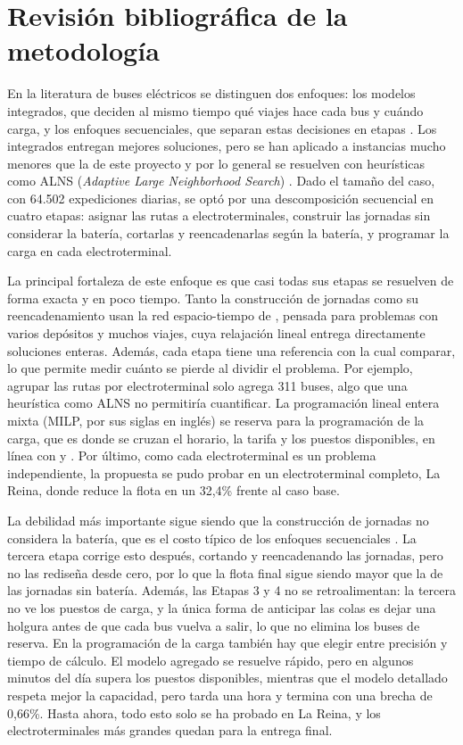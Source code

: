 \section{Revisión bibliográfica de la metodología}

En la literatura de buses eléctricos se distinguen dos enfoques: los modelos integrados, que deciden al mismo tiempo qué viajes hace cada bus y cuándo carga, y los enfoques secuenciales, que separan estas decisiones en etapas \cite{perumal2022}. Los integrados entregan mejores soluciones, pero se han aplicado a instancias mucho menores que la de este proyecto y por lo general se resuelven con heurísticas como ALNS (\textit{Adaptive Large Neighborhood Search}) \cite{wen2016, wang2024}. Dado el tamaño del caso, con 64.502 expediciones diarias, se optó por una descomposición secuencial en cuatro etapas: asignar las rutas a electroterminales, construir las jornadas sin considerar la batería, cortarlas y reencadenarlas según la batería, y programar la carga en cada electroterminal.

La principal fortaleza de este enfoque es que casi todas sus etapas se resuelven de forma exacta y en poco tiempo. Tanto la construcción de jornadas como su reencadenamiento usan la red espacio-tiempo de , pensada para problemas con varios depósitos y muchos viajes, cuya relajación lineal entrega directamente soluciones enteras. Además, cada etapa tiene una referencia con la cual comparar, lo que permite medir cuánto se pierde al dividir el problema. Por ejemplo, agrupar las rutas por electroterminal solo agrega 311 buses, algo que una heurística como ALNS no permitiría cuantificar. La programación lineal entera mixta (MILP, por sus siglas en inglés) se reserva para la programación de la carga, que es donde se cruzan el horario, la tarifa y los puestos disponibles, en línea con  y . Por último, como cada electroterminal es un problema independiente, la propuesta se pudo probar en un electroterminal completo, La Reina, donde reduce la flota en un 32,4\% frente al caso base.

La debilidad más importante sigue siendo que la construcción de jornadas no considera la batería, que es el costo típico de los enfoques secuenciales \cite{perumal2022}. La tercera etapa corrige esto después, cortando y reencadenando las jornadas, pero no las rediseña desde cero, por lo que la flota final sigue siendo mayor que la de las jornadas sin batería. Además, las Etapas 3 y 4 no se retroalimentan: la tercera no ve los puestos de carga, y la única forma de anticipar las colas es dejar una holgura antes de que cada bus vuelva a salir, lo que no elimina los buses de reserva. En la programación de la carga también hay que elegir entre precisión y tiempo de cálculo. El modelo agregado se resuelve rápido, pero en algunos minutos del día supera los puestos disponibles, mientras que el modelo detallado respeta mejor la capacidad, pero tarda una hora y termina con una brecha de 0,66\%. Hasta ahora, todo esto solo se ha probado en La Reina, y los electroterminales más grandes quedan para la entrega final.


